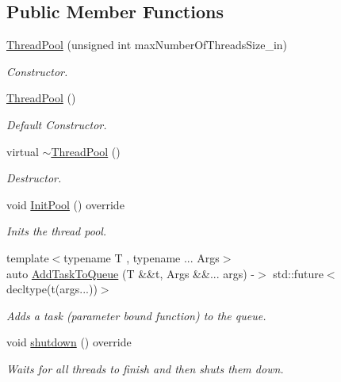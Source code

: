 \subsection*{Public Member Functions}
\begin{DoxyCompactItemize}
\item 
\mbox{\hyperlink{classThreadHandler_1_1ThreadPool_ad9913356ca9ad725c316f80a74f946d4}{Thread\+Pool}} (unsigned int max\+Number\+Of\+Threads\+Size\+\_\+in)
\begin{DoxyCompactList}\small\item\em Constructor. \end{DoxyCompactList}\item 
\mbox{\hyperlink{classThreadHandler_1_1ThreadPool_aa01e28657e1386f93c21977a659d5088}{Thread\+Pool}} ()
\begin{DoxyCompactList}\small\item\em Default Constructor. \end{DoxyCompactList}\item 
\mbox{\label{classThreadHandler_1_1ThreadPool_a8c0fce41d455d74e5fa59dfaa2b4cc38}} 
virtual \mbox{\hyperlink{classThreadHandler_1_1ThreadPool_a8c0fce41d455d74e5fa59dfaa2b4cc38}{$\sim$\+Thread\+Pool}} ()
\begin{DoxyCompactList}\small\item\em Destructor. \end{DoxyCompactList}\item 
void \mbox{\hyperlink{classThreadHandler_1_1ThreadPool_aa4bd9362ff48ad5b08b7ccc611940761}{Init\+Pool}} () override
\begin{DoxyCompactList}\small\item\em Inits the thread pool. \end{DoxyCompactList}\item 
{\footnotesize template$<$typename T , typename ... Args$>$ }\\auto \mbox{\hyperlink{classThreadHandler_1_1ThreadPool_a6fef7078a1caf7b71789e90cb9960c98}{Add\+Task\+To\+Queue}} (T \&\&t, Args \&\&... args) -\/$>$ std\+::future$<$ decltype(t(args...))$>$
\begin{DoxyCompactList}\small\item\em Adds a task (parameter bound function) to the queue. \end{DoxyCompactList}\item 
void \mbox{\hyperlink{classThreadHandler_1_1ThreadPool_a302eb0a0297c64a23b12022e63be4da6}{shutdown}} () override
\begin{DoxyCompactList}\small\item\em Waits for all threads to finish and then shuts them down. \end{DoxyCompactList}\end{DoxyCompactItemize}
